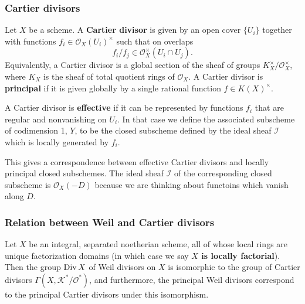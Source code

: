 \documentclass[12pt]{article}
\begin{document}
\subsubsection{Cartier divisors}
\begin{definition}
    Let $X$ be a scheme. A \textbf{Cartier divisor} is given by an open cover $\{U_i\}$ together with functions $f_i \in \mathcal O_X(U_i)^\times$ such that on overlaps
    \[
        f_i/f_j \in \mathcal O_X^\times(U_i \cap U_j).
    \]
    Equivalently, a Cartier divisor is a global section of the sheaf of groups $K_X^\times / \mathcal O_X^\times$, where $K_X$ is the sheaf of total quotient rings of $\mathcal O_X$. A Cartier divisor is \textbf{principal} if it is given globally by a single rational function $f \in K(X)^\times$.
\end{definition}

\begin{definition}
    A Cartier divisor is \textbf{effective} if it can be represented by functions $f_i$ that are regular and nonvanishing on $U_i$. In that case we define the associated subscheme of codimension 1, $Y$, to be the closed subscheme defined by the ideal sheaf $\mathcal{I}$ which is locally generated by $f_i$.
\end{definition}

This gives a correspondence between effective Cartier divisors and locally principal closed subschemes. The ideal sheaf $\mathcal{I}$ of the corresponding closed subscheme is $\mathcal{O}_X(-D)$ because we are thinking about functoins which vanish along $D$.

\subsubsection{Relation between Weil and Cartier divisors}

\begin{proposition}
    Let \(X\) be an integral, separated noetherian scheme, all of whose local rings are unique factorization domains (in which case we say \textbf{\(X\) is locally factorial}). Then the group \(\operatorname{Div} X\) of Weil divisors on \(X\) is isomorphic to the group of Cartier divisors \(\Gamma(X,\mathcal{K}^*/\mathcal{O}^*)\), and furthermore, the principal Weil divisors correspond to the principal Cartier divisors under this isomorphism.
\end{proposition}
\end{document}
